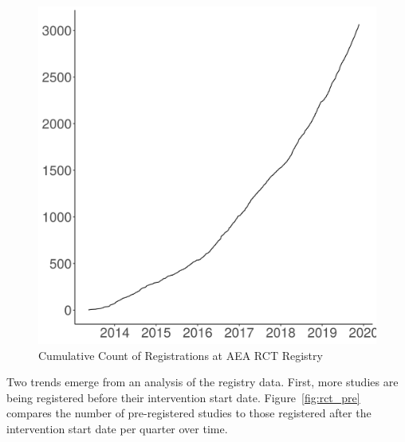 \documentclass[PP]{AEA}
\begin{document}
\begin{figure}
    \includegraphics[height=0.4\textheight]{images/figure_rctgrowth.png}
    \caption{Cumulative Count of Registrations at AEA RCT Registry\label{fig:rct_cumulative}}
	
\end{figure} 

Two trends emerge from an analysis of the registry data. First, more studies are being registered before their intervention start date. Figure~\ref{fig:rct_pre} compares the number of pre-registered studies to those registered after the intervention start date per quarter over time. 
\end{document}
